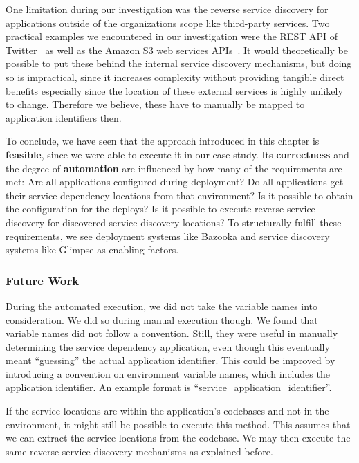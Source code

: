 One limitation during our investigation was the reverse service discovery for applications outside of the organizations scope like third-party services. Two practical examples we encountered in our investigation were the REST API of Twitter~\cite{twitterdev} as well as the Amazon S3 web services APIs~\cite{amazons3}. It would theoretically be possible to put these behind the internal service discovery mechanisms, but doing so is impractical, since it increases complexity without providing tangible direct benefits especially since the location of these external services is highly unlikely to change. Therefore we believe, these have to manually be mapped to application identifiers then.

To conclude, we have seen that the approach introduced in this chapter is \textbf{feasible}, since we were able to execute it in our case study. Its \textbf{correctness} and the degree of \textbf{automation} are influenced by how many of the requirements are met: Are all applications configured during deployment? Do all applications get their service dependency locations from that environment? Is it possible to obtain the configuration for the deploys? Is it possible to execute reverse service discovery for discovered service discovery locations? To structurally fulfill these requirements, we see deployment systems like Bazooka and service discovery systems like Glimpse as enabling factors.

\subsubsection{Future Work}

During the automated execution, we did not take the variable names into consideration. We did so during manual execution though. We found that variable names did not follow a convention. Still, they were useful in manually determining the service dependency application, even though this eventually meant ``guessing'' the actual application identifier. This could be improved by introducing a convention on environment variable names, which includes the application identifier. An example format is ``service\_{application\_identifier}''.

If the service locations are within the application's codebases and not in the environment, it might still be possible to execute this method. This assumes that we can extract the service locations from the codebase. We may then execute the same reverse service discovery mechanisms as explained before.

